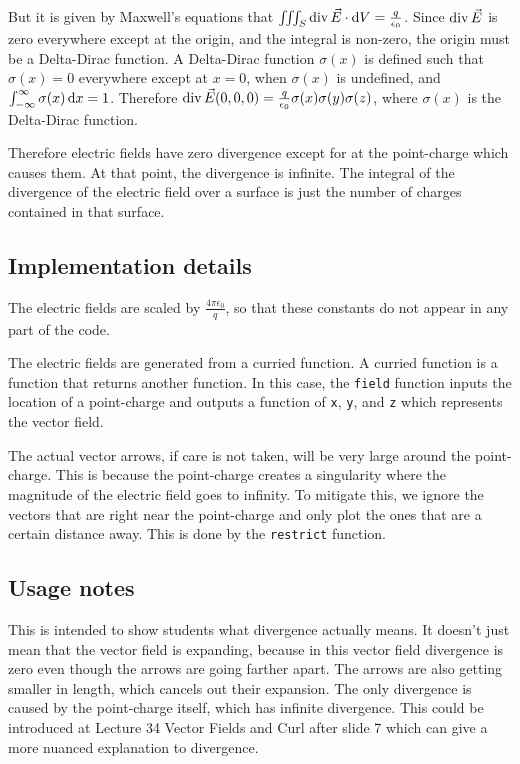 But it is given by Maxwell's equations that \(\iiint_S \divf \vec E \cdot \dif V = \frac{q}{\epsilon_0}\). Since \(\operatorname{div} \vec E\) is zero everywhere except at the origin, and the integral is non-zero, the origin must be a Delta-Dirac function. A Delta-Dirac function \(\sigma (x)\) is defined such that \(\sigma (x) = 0\) everywhere except at \(x = 0\), when \(\sigma(x)\) is undefined, and \(\int_{-\infty}^\infty \sigma(x) \dif x = 1\).  Therefore \(\operatorname{div} \vec E (0, 0, 0) = \frac{q}{\epsilon_0} \sigma(x)\sigma(y)\sigma(z)\), where \(\sigma(x)\) is the Delta-Dirac function.

Therefore electric fields have zero divergence except for at the point-charge which causes them. At that point, the divergence is infinite. The integral of the divergence of the electric field over a surface is just the number of charges contained in that surface.

\subsection*{Implementation details}

The electric fields are scaled by \(\frac{4 \pi \epsilon_0}{q}\), so that these constants do not appear in any part of the code.

The electric fields are generated from a curried function. A curried function is a function that returns another function. In this case, the \verb+field+ function inputs the location of a point-charge and outputs a function of \verb+x+, \verb+y+, and \verb+z+ which represents the vector field.

The actual vector arrows, if care is not taken, will be very large around the point-charge. This is because the point-charge creates a singularity where the magnitude of the electric field goes to infinity. To mitigate this, we ignore the vectors that are right near the point-charge and only plot the ones that are a certain distance away. This is done by the \verb+restrict+ function.

\subsection*{Usage notes}

This is intended to show students what divergence actually means. It doesn't just mean that the vector field is expanding, because in this vector field divergence is zero even though the arrows are going farther apart. The arrows are also getting smaller in length, which cancels out their expansion. The only divergence is caused by the point-charge itself, which has infinite divergence. This could be introduced at Lecture 34 Vector Fields and Curl after slide 7 which can give a more nuanced explanation to divergence.

